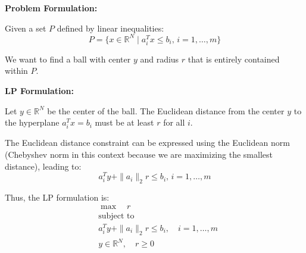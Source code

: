\documentclass{article}
\begin{document}
\textbf{Problem Formulation:}

Given a set \( P \) defined by linear inequalities:
\[
P = \{ x \in \mathbb{R}^N \mid a_i^T x \leq b_i, \, i = 1, \ldots, m \}
\]

We want to find a ball with center \( y \) and radius \( r \) that is entirely contained within \( P \).

\textbf{LP Formulation:}

Let \( y \in \mathbb{R}^N \) be the center of the ball. The Euclidean distance from the center \( y \) to the hyperplane \( a_i^T x = b_i \) must be at least \( r \) for all \( i \).

The Euclidean distance constraint can be expressed using the Euclidean norm (Chebyshev norm in this context because we are maximizing the smallest distance), leading to:
\[
a_i^T y + \| a_i \|_2 r \leq b_i, \, i = 1, \ldots, m
\]

Thus, the LP formulation is:
\[
\begin{aligned}
& \max \quad r \\
& \text{subject to} \\
& a_i^T y + \| a_i \|_2 r \leq b_i, \quad i = 1, \ldots, m \\
& y \in \mathbb{R}^N, \quad r \geq 0
\end{aligned}
\]
\end{document}

